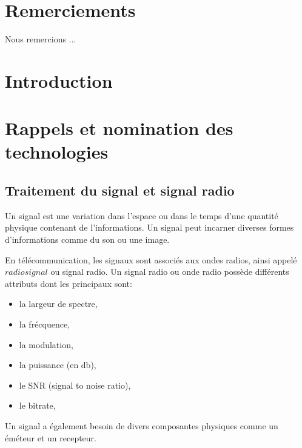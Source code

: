 \documentclass[12pt,a4paper,oneside, titlepage]{report}
\begin{document}
{}
\chapter*{Remerciements}
\renewcommand{\leftmark}{REMERCIEMENTS}

Nous remercions ...\\

\newpage
\renewcommand{\leftmark}{TABLE DES MATI\`{E}RES}
\thispagestyle{fancy}
\tableofcontents


\newpage
{}
\renewcommand{\leftmark}{INTRODUCTION}

\chapter*{Introduction}


\chapter{Rappels et nomination des technologies}

\section{Traitement du signal et signal radio}

Un signal est une variation dans l'espace ou dans le temps d'une quantité physique contenant de l'informations. Un signal peut incarner diverses formes d'informations comme du son ou une image. 

En télécommunication, les signaux sont associés aux ondes radios, ainsi appelé $radio signal$ ou signal radio. Un signal radio ou onde radio possède différents attributs dont les principaux sont: 

\begin{itemize}
\item la largeur de spectre,
\item la frécquence,
\item la modulation,
\item la puissance (en db),
\item le SNR (signal to noise ratio),
\item le bitrate,

\end{itemize}

Un signal a également besoin de divers composantes physiques comme un éméteur et un recepteur.
\end{document}

